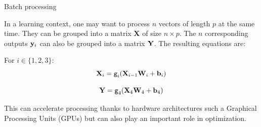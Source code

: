 \documentclass[xcolor=pdftex,dvipsnames,table,mathserif]{beamer}
\begin{document}

\begin{frame}{Batch processing}

  In a learning context, one may want to process $n$ vectors of length $p$ at the same time.
They can be grouped into a matrix $\mathbf{X}$ of size $n \times p$. The $n$ corresponding outputs $\mathbf{y}_i$ can also be grouped into a matrix $\mathbf{Y}$. The resulting equations are:

\begin{block}{}
  For $i \in \{1, 2, 3\}$:
    \[\mathbf{X}_i = \texttt{g}_i(\mathbf{X}_{i-1}\mathbf{W}_i + \mathbf{b}_i)\]
  \end{block}
\begin{block}{}
    \[\mathbf{Y} = \texttt{g}_4(\mathbf{X}_4\mathbf{W}_4 + \mathbf{b}_4)\]
  \end{block}

  This can accelerate processing thanks to hardware architectures such a Graphical Processing Units (GPUs) but can also play an important role in optimization.

\end{frame}
\end{document}
